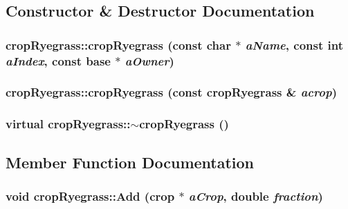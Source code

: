 \subsection{Constructor \& Destructor Documentation}
\hypertarget{classcrop_ryegrass_a39d6d74db795bf6cf394ab5f055dbb2a}{
\subsubsection[{cropRyegrass}]{\setlength{\rightskip}{0pt plus 5cm}cropRyegrass::cropRyegrass (const char $\ast$ {\em aName}, \/  const int {\em aIndex}, \/  const {\bf base} $\ast$ {\em aOwner})}}
\label{classcrop_ryegrass_a39d6d74db795bf6cf394ab5f055dbb2a}
\hypertarget{classcrop_ryegrass_aeea36991d9749de3448b4c60d1338bd5}{
\subsubsection[{cropRyegrass}]{\setlength{\rightskip}{0pt plus 5cm}cropRyegrass::cropRyegrass (const {\bf cropRyegrass} \& {\em acrop})}}
\label{classcrop_ryegrass_aeea36991d9749de3448b4c60d1338bd5}
\hypertarget{classcrop_ryegrass_a807136660c42b9bc34009d182037893c}{
\subsubsection[{$\sim$cropRyegrass}]{\setlength{\rightskip}{0pt plus 5cm}virtual cropRyegrass::$\sim$cropRyegrass ()}}
\label{classcrop_ryegrass_a807136660c42b9bc34009d182037893c}


\subsection{Member Function Documentation}
\hypertarget{classcrop_ryegrass_a3ee92e29d981a5bcae487e10f5aa18d4}{
\subsubsection[{Add}]{\setlength{\rightskip}{0pt plus 5cm}void cropRyegrass::Add ({\bf crop} $\ast$ {\em aCrop}, \/  double {\em fraction})}}
\label{classcrop_ryegrass_a3ee92e29d981a5bcae487e10f5aa18d4}


